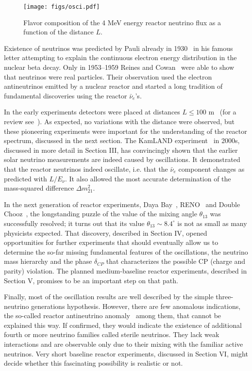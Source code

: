 \begin{figure}[htb]
\begin{centering}
\texttt{[image: figs/osci.pdf]}
\par\end{centering}
\caption{\label{fig:intro1} Flavor composition of the 4 MeV energy reactor neutrino flux as a function of the distance  $L$. }
\end{figure}

Existence of neutrinos was predicted by Pauli already in 1930~\cite{Pauli30} in his famous letter attempting to explain the continuous electron
energy distribution in the nuclear beta decay. Only in 1953--1959 Reines and Cowan~\cite{Reines53,Cowan56,Reines59} were able to show that neutrinos
were real particles. Their observation used the electron antineutrinos emitted by a nuclear reactor and started a long tradition of fundamental
discoveries using the reactor $\bar{\nu}_e$'s.

In the early experiments detectors were placed at distances $L \le 100$ m~\cite{ILL,Gosgen,Rovno,Krasnoyarsk,SRP,Bugey4,Bugey3} (for a review see~\cite{Bemporad02}). As expected, no variations
with the distance were observed, but these pioneering experiments were important for the understanding of the reactor spectrum, discussed
in the next section. The KamLAND experiment~\cite{Kamland03,Kamland05,Kamland08} in 2000s, discussed in more detail in Section III, has convincingly shown that the earlier
solar neutrino measurements are indeed  caused by oscillations. It demonstrated that the reactor neutrinos indeed
oscillate, i.e. that the $\bar{\nu}_e$ component changes as predicted with $L/E_{\nu}$. It also allowed the most accurate determination of the 
mass-squared difference $\Delta m^2_{21}$.  

In the next generation of reactor experiments, Daya Bay~\cite{Dayabay,Dayabay14}, RENO~\cite{Reno}  and Double Chooz~\cite{DChooz,DChooz14}, the longstanding puzzle of the
value of the mixing angle $\theta_{13}$ was successfully resolved; it turns out that its value $\theta_{13} \sim 8.4^\circ$
is not as small as many physicists expected. That discovery, described in Section IV, opened opportunities for further experiments that should  
eventually allow us to determine the so-far missing fundamental features of the oscillations, the neutrino mass hierarchy and the phase $\delta_{CP}$ that characterizes the possible CP (charge and parity) violation. 
The planned medium-baseline reactor experiments, described in Section V,  promises to be an important step on that path.

Finally, most of the oscillation results are well described by the simple three-neutrino generations hypothesis. However, there are few anomalous indications,
the so-called reactor antineutrino anomaly~\cite{Mention} among them, that cannot be explained this way. If confirmed, they would indicate the existence of additional
fourth or more neutrino families called sterile neutrinos. They lack  weak interactions and are observable only due to their mixing with the familiar active neutrinos.  Very short baseline
reactor experiments, discussed in Section VI, might decide whether this fascinating possibility is realistic or not.
